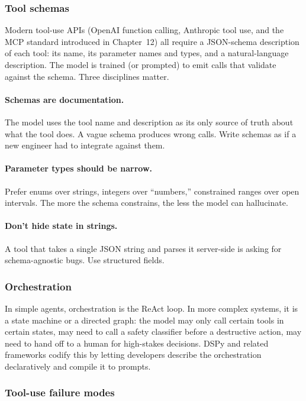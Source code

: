 \subsubsection{Tool schemas}

Modern tool-use APIs (OpenAI function calling, Anthropic tool use,
and the MCP standard introduced in Chapter~12) all require a
JSON-schema description of each tool: its name, its parameter
names and types, and a natural-language description. The model is
trained (or prompted) to emit calls that validate against the
schema. Three disciplines matter.

\paragraph{Schemas are documentation.} The model uses the tool
name and description as its only source of truth about what the
tool does. A vague schema produces wrong calls. Write schemas as
if a new engineer had to integrate against them.

\paragraph{Parameter types should be narrow.} Prefer enums over
strings, integers over ``numbers,'' constrained ranges over open
intervals. The more the schema constrains, the less the model can
hallucinate.

\paragraph{Don't hide state in strings.} A tool that takes a
single JSON string and parses it server-side is asking for
schema-agnostic bugs. Use structured fields.

\subsubsection{Orchestration}

In simple agents, orchestration is the ReAct loop. In more
complex systems, it is a state machine or a directed graph: the
model may only call certain tools in certain states, may need to
call a safety classifier before a destructive action, may need to
hand off to a human for high-stakes decisions. DSPy
\citep{khattab2023dspy} and related frameworks codify this by
letting developers describe the orchestration declaratively and
compile it to prompts.

\subsubsection{Tool-use failure modes}

